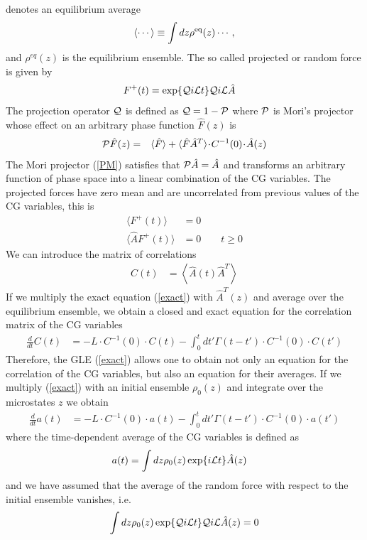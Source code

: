 \documentclass[b5paper,openright,11pt]{book}
\newcommand{\esc}{\!\cdot\!}
\newcommand{\llangle}{\left\langle}
\newcommand{\rrangle}{\right\rangle}
\begin{document}
denotes an equilibrium average
\begin{equation}
\langle\cdots\rangle\equiv \int dz\rho^{\rm eq}(z)\cdots,
\label{esc}
\end{equation}
and  $\rho^{eq}(z)$ is  the  equilibrium  ensemble.
The so called projected or random force is given by
\begin{align}
F^+(t)&= \exp\{{\cal Q}i{\cal L}t\} {\cal Q}i{\cal L}\hat{A}  
\label{Proj}
\end{align}
The projection operator ${\cal Q}$ is defined as ${\cal Q}=1-{\cal P}$
where  ${\cal P}$  is Mori's  projector whose  effect on  an arbitrary
phase function $\hat{F}(z)$ is
\begin{eqnarray}
  {\cal P}\hat{F}(z) &=& \langle \hat{F}\rangle+ \langle \hat{F}\hat{A}^T \rangle\esc  C^{-1}(0)\esc  \hat{A}(z)
\label{PM}
\end{eqnarray}
The  Mori  projector  (\ref{PM})   satisfies  that  ${\cal  P}\hat{A}=
\hat{A}$ and  transforms an arbitrary  function of phase space  into a
linear combination  of the  CG variables.   The projected  forces have
zero  mean  and  are  uncorrelated  from
previous values of the CG variables, this is 
\begin{align}
\langle  F^+  (t)\rangle&=0  
\nonumber\\
\langle \hat{A} F^+ (t)\rangle&=0 \quad\quad t\ge 0
\end{align}
We can introduce the matrix of correlations 
\begin{align}
  C(t)&=  \llangle \hat{A}(t)\hat{A}^T\rrangle
\end{align}
If we multiply the  exact equation (\ref{exact})  with $\hat{A}^T(z)$
and  average over  the equilibrium  ensemble, we  obtain a  closed and
exact equation for the correlation matrix of the CG variables
\begin{align}
  \frac{d}{dt}C(t)&=-L\esc C^{-1}(0)\esc C(t)
-\int_0^tdt' \Gamma(t-t')\esc C^{-1}(0)\esc  C(t')
\label{exactC}
\end{align}
Therefore, the GLE (\ref{exact}) allows  one to obtain not only an equation for the correlation of the CG variables, but also an equation for  their averages. 
If we multiply  (\ref{exact}) with an initial ensemble $\rho_0(z)$ and integrate over the microstates $z$ we obtain
\begin{align}
  \frac{d}{dt}a(t) &= -L\esc C^{-1}(0)\esc a(t)
  -\int_0^tdt' \Gamma(t-t')\esc  C^{-1}(0)\esc a(t')
\label{exactAve}
\end{align}
where the time-dependent average of the CG variables is defined as
\begin{align}
  a(t)&=\int dz \rho_0(z) \exp\{i{\cal L}t\}\hat{A}(z)
\end{align}
and we have assumed that the average of the random force with respect
to the initial ensemble vanishes, i.e.
\begin{align}
\int dz\rho_0(z)\exp\{{\cal Q}i{\cal L}t\} {\cal Q}i{\cal L}\hat{A}(z)=0
\label{F0}
\end{align}
\end{document}
